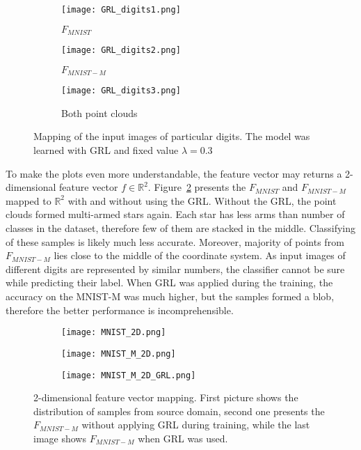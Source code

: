 \documentclass[shortabstract, inz, english]{iithesis}
\begin{document}
\begin{figure}%
    \centering
    
    \begin{subfigure}[b]{0.33\textwidth}
        \texttt{[image: GRL\_digits1.png]}
        \caption{$F_{MNIST}$}
    \end{subfigure}%
    \begin{subfigure}[b]{0.33\textwidth}
        \texttt{[image: GRL\_digits2.png]}
        \caption{$F_{MNIST-M}$}
    \end{subfigure}%
    \begin{subfigure}[b]{0.33\textwidth}
        \texttt{[image: GRL\_digits3.png]}
        \caption{Both point clouds}
    \end{subfigure}%

    \caption{Mapping of the input images of particular digits. The model was learned with GRL and fixed value $\lambda = 0.3$}%
    \label{fig:GRL_digits}%
\end{figure}

\par
To make the plots even more understandable, the feature vector may returns a 2-dimensional feature vector $f \in \mathbb{R}^{2}$. Figure~\ref{fig:2D} presents the $F_{MNIST}$ and $F_{MNIST-M}$ mapped to $\mathbb{R}^{2}$ with and without using the GRL. Without the GRL, the point clouds formed multi-armed stars again. Each star has less arms than number of classes in the dataset, therefore few of them are stacked in the middle. Classifying of these samples is likely much less accurate. Moreover, majority of points from $F_{MNIST-M}$ lies close to the middle of the coordinate system. As input images of different digits are represented by similar numbers, the classifier cannot be sure while predicting their label. When GRL was applied during the training, the accuracy on the MNIST-M was much higher, but the samples formed a blob, therefore the better performance is incomprehensible. 

\begin{figure}[htb]%
    \centering
    
    \begin{subfigure}[b]{0.33\textwidth}
        \texttt{[image: MNIST\_2D.png]}
    \end{subfigure}%
    \begin{subfigure}[b]{0.33\textwidth}
        \texttt{[image: MNIST\_M\_2D.png]}
    \end{subfigure}%
    \begin{subfigure}[b]{0.33\textwidth}
        \texttt{[image: MNIST\_M\_2D\_GRL.png]}
    \end{subfigure}%
    
    \caption{2-dimensional feature vector mapping. First picture shows the distribution of samples from source domain, second one presents the $F_{MNIST-M}$ without applying GRL during training, while the last image shows $F_{MNIST-M}$ when GRL was used.}%
    \label{fig:2D}%
\end{figure}
\end{document}

